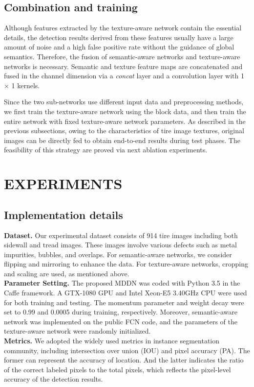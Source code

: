 \documentclass{article}
\begin{document}
\subsection{Combination and training}
\label{Combination and training}

Although features extracted by the texture-aware network contain the essential details, the detection results derived from these features usually have a large amount of noise and a high false positive rate without the guidance of global semantics. Therefore, the fusion of semantic-aware networks and texture-aware networks is necessary. Semantic and texture feature maps are concatenated and fused in the channel dimension via a {\it concat} layer and a convolution layer with 1 $\times$ 1 kernels.

Since the two sub-networks use different input data and preprocessing methods, we first train the texture-aware network using the block data, and then train the entire network with fixed texture-aware network parameters. As described in the previous subsections, owing to the characteristics of tire image textures, original images can be directly fed to obtain end-to-end results during test phases. The feasibility of this strategy are proved via next ablation experiments.


\section{EXPERIMENTS}
\label{sec:pagestyle}
\subsection{Implementation details}
\label{Implementation details}
{\bf Dataset.} Our experimental dataset consists of 914 tire images including both sidewall and tread images. These images involve various defects such as metal impurities, bubbles, and overlaps. For semantic-aware networks, we consider flipping and mirroring to enhance the data. For texture-aware networks, cropping and scaling are used, as mentioned above.\\
{\bf Parameter Setting.} The proposed MDDN was coded with Python 3.5 in the Caffe framework. A GTX-1080 GPU and Intel Xeon-E5 3.40GHz CPU were used for both training and testing. The momentum parameter and weight decay were set to 0.99 and 0.0005 during training, respectively. Moreover, semantic-aware network was implemented on the public FCN code, and the parameters of the texture-aware network were randomly initialized. \\
{\bf Metrics.} We adopted the widely used metrics in instance segmentation community, including intersection over union (IOU) and pixel accuracy (PA). The former can represent the accuracy of location. And the latter indicates the ratio of the correct labeled pixels to the total pixels, which reflects the pixel-level accuracy of the detection results.
\end{document}

